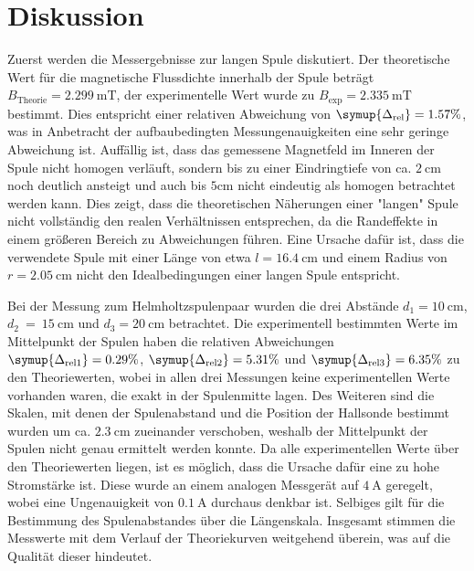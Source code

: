 \section{Diskussion}
\label{sec:Diskussion}
Zuerst werden die Messergebnisse zur langen Spule diskutiert. Der theoretische Wert für die magnetische Flussdichte innerhalb der Spule beträgt 
$B_{\text{Theorie}} = 2.299\:\unit{\milli\tesla}$, der experimentelle Wert wurde zu $B_{\text{exp}} = 2.335\:\unit{\milli\tesla}$ bestimmt. 
Dies entspricht einer relativen Abweichung von $\symup{\Delta_{\text{rel}}} = 1.57 \%$, was in Anbetracht der aufbaubedingten Messungenauigkeiten 
eine sehr geringe Abweichung ist. Auffällig ist, dass das gemessene Magnetfeld im Inneren der Spule nicht homogen verläuft, sondern bis zu einer Eindringtiefe von
ca. $2 \: \unit{\centi\metre}$ noch deutlich ansteigt und auch bis $5 \unit{\centi\metre}$ nicht eindeutig als homogen betrachtet werden kann.
Dies zeigt, dass die theoretischen Näherungen einer "langen"\: Spule nicht vollständig den realen Verhältnissen entsprechen, da die Randeffekte in einem größeren
Bereich zu Abweichungen führen. Eine Ursache dafür ist, dass die verwendete Spule mit einer Länge von etwa $l = 16.4\: \unit{\centi\metre}$ und einem Radius von 
$r = 2.05 \: \unit{\centi\metre}$ nicht den Idealbedingungen einer langen Spule entspricht.


Bei der Messung zum Helmholtzspulenpaar wurden die drei Abstände $d_1 = 10\: \unit{\centi\metre}$, $d_2~=~15\: \unit{\centi\metre}$
und $d_3 = 20\: \unit{\centi\metre}$ betrachtet. Die experimentell bestimmten Werte im Mittelpunkt der Spulen haben die relativen Abweichungen 
$\symup{\Delta_{\text{rel}1}} = 0.29 \%$, $\symup{\Delta_{\text{rel}2}} = 5.31\%$ und $\symup{\Delta_{\text{rel}3}} = 6.35 \%$ zu den Theoriewerten, wobei in allen 
drei Messungen keine experimentellen Werte vorhanden waren, die exakt in der Spulenmitte lagen. Des Weiteren sind die Skalen, mit denen der Spulenabstand und die 
Position der Hallsonde bestimmt wurden um ca. $2.3\: \unit{\centi\metre}$ zueinander verschoben, weshalb der Mittelpunkt der Spulen nicht genau ermittelt werden konnte.
Da alle experimentellen Werte über den Theoriewerten liegen, ist es möglich, dass die Ursache dafür eine zu hohe Stromstärke ist. Diese wurde an einem
analogen Messgerät auf $4 \: \unit{\ampere}$ geregelt, wobei eine Ungenauigkeit von $0.1 \: \unit{\ampere}$ durchaus denkbar ist. Selbiges gilt für die Bestimmung des
Spulenabstandes über die Längenskala. Insgesamt stimmen die Messwerte mit dem Verlauf der Theoriekurven weitgehend überein, was auf die Qualität dieser hindeutet.


